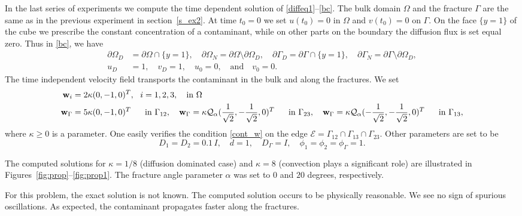 \documentclass{article}
\newcommand{\bw}{\mathbf w}
\begin{document}
In the last series of experiments we compute the time dependent solution of \eqref{diffeq1}--\eqref{bc}. The bulk domain $\Omega$
and the fracture $\Gamma$ are the same as in the previous experiment in section~\ref{s_ex2}.
At  time
$t_0=0$ we set $u(t_0)=0$ in $\Omega$ and  $v(t_0)=0$ on $\Gamma$. On the face $\{y=1\}$ of the cube  we prescribe the constant concentration of a contaminant, while on other parts on the boundary the  diffusion flux is  set equal zero. Thus in \eqref{bc}, we have
\[
\begin{split}
\partial\Omega_D&=\partial\Omega\cap\{y=1\},\quad\partial\Omega_N=\partial\Omega\setminus\partial\Omega_D,\quad \partial\Gamma_D=\partial\Gamma\cap\{y=1\},\quad \partial\Gamma_N=\partial\Gamma\setminus\partial\Omega_D,\\  u_D&=1,\quad v_D=1,\quad u_0=0,\quad \text{and}\quad v_0=0.
\end{split}
\]
The time independent velocity field transports the contaminant in the bulk and along the fractures.
We set
\[
\begin{split}
\bw_i&=2\kappa(0,-1,0)^T,~~i=1,2,3,\quad\text{in}~\Omega\\
\bw_\Gamma&=5\kappa(0,-1,0)^T~~\quad\text{in}~\Gamma_{12},\quad
\bw_\Gamma=\kappa\mathcal{Q}_\alpha({\footnotesize\frac{1}{\sqrt{2}}},-{\footnotesize\frac{1}{\sqrt{2}}},0)^T
~~\quad\text{in}~\Gamma_{23},\quad
\bw_\Gamma=\kappa\mathcal{Q}_\alpha(-{\footnotesize\frac{1}{\sqrt{2}}},-{\footnotesize\frac{1}{\sqrt{2}}},0)^T~~\quad\text{in}~\Gamma_{13},
\end{split}
\]
where $\kappa\ge0$ is a parameter. One easily verifies the condition \eqref{cont_w} on the edge $\mathcal{E}=\Gamma_{12}\cap\Gamma_{13}\cap\Gamma_{23}$. Other parameters are set to be
\[
D_1=D_2=0.1\,I,\quad d=1,\quad D_\Gamma=I, \quad \phi_1=\phi_2=\phi_\Gamma=1.
\]




The computed solutions for $\kappa=1/8$ (diffusion dominated case) and $\kappa=8$ (convection plays a significant role)  are illustrated in Figures~\ref{fig:prop}--\ref{fig:prop1}. The fracture angle parameter $\alpha$ was set to $0$ and $20$ degrees, {respectively}.  %


For this problem, the exact solution is not known. The computed solution occurs to be physically reasonable. We see no sign of spurious oscillations. {As expected, the contaminant propagates faster along the fractures.}
\end{document}
